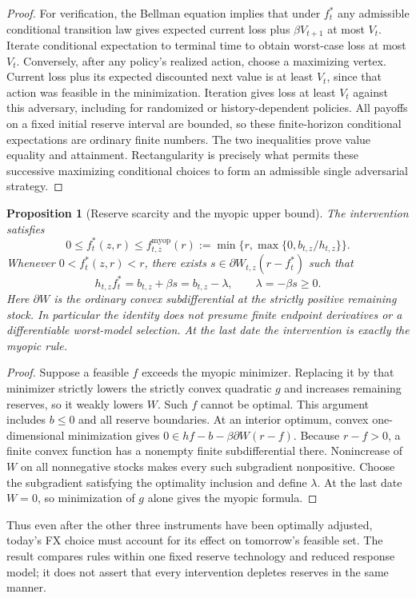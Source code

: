 \documentclass[11pt]{article}
\newtheorem{proposition}{Proposition}
\theoremstyle{definition}
\begin{document}
\begin{proof}
For verification, the Bellman equation implies that under $f_t^*$ any
admissible conditional transition law gives expected current loss plus
$\beta V_{t+1}$ at most $V_t$. Iterate conditional expectation to terminal
time to obtain worst-case loss at most $V_t$. Conversely, after any
policy's realized action, choose a maximizing vertex. Current loss plus
its expected discounted next value is at least $V_t$, since that action
was feasible in the minimization. Iteration gives loss at least $V_t$
against this adversary, including for randomized or history-dependent
policies. All payoffs on a fixed initial reserve interval are bounded,
so these finite-horizon conditional expectations are ordinary finite
numbers. The two inequalities prove value equality and attainment.
Rectangularity is precisely what permits these successive maximizing
conditional choices to form an admissible single adversarial strategy.
\end{proof}

\begin{proposition}[Reserve scarcity and the myopic upper bound]
The intervention satisfies
\[
 0\leq f_t^*(z,r)\leq f_{t,z}^{\mathrm{myop}}(r)
       :=\min\{r,\max\{0,b_{t,z}/h_{t,z}\}\}.
\]
Whenever $0<f_t^*(z,r)<r$, there exists
$s\in\partial W_{t,z}(r-f_t^*)$ such that
\[
 h_{t,z}f_t^*=b_{t,z}+\beta s
             =b_{t,z}-\lambda,\qquad \lambda=-\beta s\geq0.
\]
Here $\partial W$ is the ordinary convex subdifferential at the strictly
positive remaining stock. In particular the identity does not presume
finite endpoint derivatives or a differentiable worst-model selection.
At the last date the intervention is exactly the myopic rule.
\end{proposition}
\begin{proof}
Suppose a feasible $f$ exceeds the myopic minimizer. Replacing it by that
minimizer strictly lowers the strictly convex quadratic $g$ and increases
remaining reserves, so it weakly lowers $W$. Such $f$ cannot be optimal.
This argument includes $b\leq0$ and all reserve boundaries. At an interior
optimum, convex one-dimensional minimization gives
$0\in hf-b-\beta\partial W(r-f)$. Because $r-f>0$, a finite convex
function has a nonempty finite subdifferential there. Nonincrease of $W$
on all nonnegative stocks makes every such subgradient nonpositive.
Choose the subgradient satisfying the optimality inclusion and define
$\lambda$. At the last date $W=0$, so minimization of $g$ alone gives the
myopic formula.
\end{proof}
Thus even after the other three instruments have been optimally adjusted,
today's FX choice must account for its effect on tomorrow's feasible set.
The result compares rules within one fixed reserve technology and reduced
response model; it does not assert that every intervention depletes
reserves in the same manner.
\end{document}
